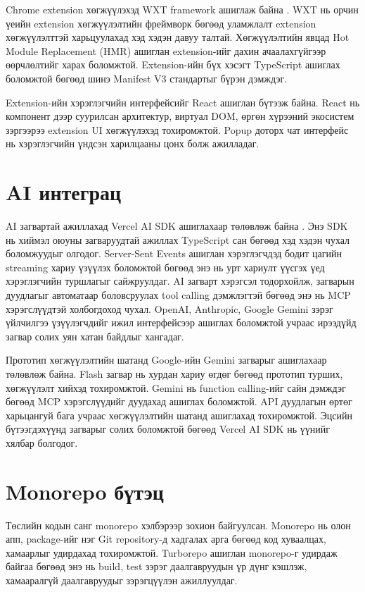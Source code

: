 Chrome extension хөгжүүлэхэд WXT framework ашиглаж байна \cite{wxt}. WXT нь орчин үеийн extension хөгжүүлэлтийн фреймворк бөгөөд уламжлалт extension хөгжүүлэлттэй харьцуулахад хэд хэдэн давуу талтай. Хөгжүүлэлтийн явцад Hot Module Replacement (HMR) ашиглан extension-ийг дахин ачаалахгүйгээр өөрчлөлтийг харах боломжтой. Extension-ийн бүх хэсэгт TypeScript ашиглах боломжтой бөгөөд шинэ Manifest V3 стандартыг бүрэн дэмждэг.

Extension-ийн хэрэглэгчийн интерфейсийг React ашиглан бүтээж байна. React нь компонент дээр суурилсан архитектур, виртуал DOM, өргөн хүрээний экосистем зэргээрээ extension UI хөгжүүлэхэд тохиромжтой. Popup доторх чат интерфейс нь хэрэглэгчийн үндсэн харилцааны цонх болж ажилладаг.

\section{AI интеграц}

AI загвартай ажиллахад Vercel AI SDK ашиглахаар төлөвлөж байна \cite{vercel-ai-sdk}. Энэ SDK нь хиймэл оюуны загваруудтай ажиллах TypeScript сан бөгөөд хэд хэдэн чухал боломжуудыг олгодог. Server-Sent Events ашиглан хэрэглэгчдэд бодит цагийн streaming хариу үзүүлэх боломжтой бөгөөд энэ нь урт хариулт үүсгэх үед хэрэглэгчийн туршлагыг сайжруулдаг. AI загварт хэрэгсэл тодорхойлж, загварын дуудлагыг автоматаар боловсруулах tool calling дэмжлэгтэй бөгөөд энэ нь MCP хэрэгслүүдтэй холбогдоход чухал. OpenAI, Anthropic, Google Gemini зэрэг үйлчилгээ үзүүлэгчдийг ижил интерфейсээр ашиглах боломжтой учраас ирээдүйд загвар солих уян хатан байдлыг хангадаг.

Прототип хөгжүүлэлтийн шатанд Google-ийн Gemini загварыг ашиглахаар төлөвлөж байна. Flash загвар нь хурдан хариу өгдөг бөгөөд прототип турших, хөгжүүлэлт хийхэд тохиромжтой. Gemini нь function calling-ийг сайн дэмждэг бөгөөд MCP хэрэгслүүдийг дуудахад ашиглах боломжтой. API дуудлагын өртөг харьцангуй бага учраас хөгжүүлэлтийн шатанд ашиглахад тохиромжтой. Эцсийн бүтээгдэхүүнд загварыг солих боломжтой бөгөөд Vercel AI SDK нь үүнийг хялбар болгодог.

\section{Monorepo бүтэц}

Төслийн кодын санг monorepo хэлбэрээр зохион байгуулсан. Monorepo нь олон апп, package-ийг нэг Git repository-д хадгалах арга бөгөөд код хуваалцах, хамаарлыг удирдахад тохиромжтой. Turborepo ашиглан monorepo-г удирдаж байгаа бөгөөд энэ нь build, test зэрэг даалгавруудын үр дүнг кэшлэж, хамааралгүй даалгавруудыг зэрэгцүүлэн ажиллуулдаг.

